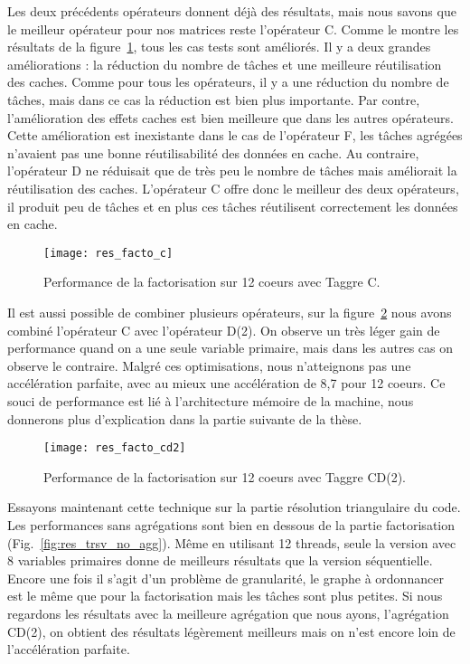 Les deux précédents opérateurs donnent déjà des résultats, mais nous savons que le meilleur opérateur pour nos matrices reste l'opérateur C.
%
Comme le montre les résultats de la figure~\ref{fig:res_facto_c}, tous les cas tests sont améliorés.
%
Il y a deux grandes améliorations : la réduction du nombre de tâches et une meilleure réutilisation des caches.
%
Comme pour tous les opérateurs, il y a une réduction du nombre de tâches, mais dans ce cas la réduction est bien plus importante.
%
Par contre, l'amélioration des effets caches est bien meilleure que dans les autres opérateurs.
%
Cette amélioration est inexistante dans le cas de l'opérateur F, les tâches agrégées n'avaient pas une bonne réutilisabilité des données en cache.
%
Au contraire, l'opérateur D ne réduisait que de très peu le nombre de tâches mais améliorait la réutilisation des caches.
%
L'opérateur C offre donc le meilleur des deux opérateurs, il produit peu de tâches et en plus ces tâches réutilisent correctement les données en cache.


\begin{figure}[t!]
  \centering
  \texttt{[image: res\_facto\_c]}
  \caption{Performance de la factorisation sur 12 coeurs avec Taggre C.}
  \label{fig:res_facto_c}
\end{figure}

Il est aussi possible de combiner plusieurs opérateurs, sur la figure~\ref{fig:res_facto_cd2} nous avons combiné l'opérateur C avec l'opérateur D(2).
%
On observe un très léger gain de performance quand on a une seule variable primaire, mais dans les autres cas on observe le contraire.
%
Malgré ces optimisations, nous n'atteignons pas une accélération parfaite, avec au mieux une accélération de 8,7 pour 12 coeurs.
%
Ce souci de performance est lié à l'architecture mémoire de la machine, nous donnerons plus d'explication dans la partie suivante de la thèse.

\begin{figure}[t!]
  \centering
  \texttt{[image: res\_facto\_cd2]}
  \caption{Performance de la factorisation sur 12 coeurs avec Taggre CD(2).}
  \label{fig:res_facto_cd2}
\end{figure}

Essayons maintenant cette technique sur la partie résolution triangulaire du code.
%
Les performances sans agrégations sont bien en dessous de la partie factorisation (Fig.~\ref{fig:res_trsv_no_agg}).
%
Même en utilisant 12 threads, seule la version avec 8 variables primaires donne de meilleurs résultats que la version séquentielle.
%
Encore une fois il s'agit d'un problème de granularité, le graphe à ordonnancer est le même que pour la factorisation mais les tâches sont plus petites.
%
Si nous regardons les résultats avec la meilleure agrégation que nous ayons, l'agrégation CD(2), on obtient des résultats légèrement meilleurs mais on n'est encore loin de l'accélération parfaite.

